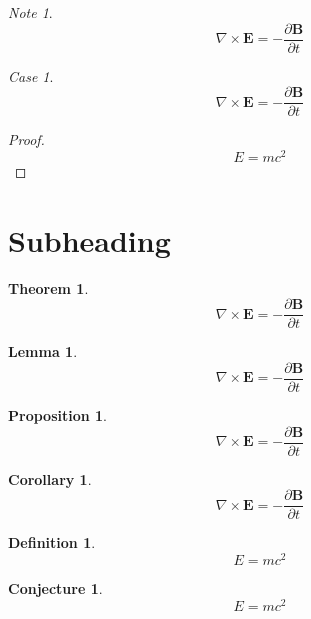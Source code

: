\documentclass[english,oneside, article]{memoir}
\theoremstyle{plain}
\newtheorem{Theorem}{Theorem}[chapter]
\newtheorem*{Lemma}{Lemma}
\newtheorem*{Proposition}{Proposition}
\newtheorem*{Corollary}{Corollary}
\theoremstyle{definition}
\newtheorem{Definition}{Definition}[chapter]
\newtheorem{Conjecture}{Conjecture}[chapter]
\theoremstyle{remark}
\newtheorem{Case}{Case}[chapter]
\newtheorem*{Note}{Note}
\begin{document}
\begin{Note}

\[\nabla \times \mathbf{E} = - \frac{\partial \mathbf{B}}{\partial t}\]

\end{Note}

\begin{Case}

\[\nabla \times \mathbf{E} = - \frac{\partial \mathbf{B}}{\partial t}\]

\end{Case}

\begin{proof}

\[E=mc^2\]

\end{proof}

\section{Subheading}\label{subheading}

\begin{Theorem}

\[\nabla \times \mathbf{E} = - \frac{\partial \mathbf{B}}{\partial t}\]

\end{Theorem}

\begin{Lemma}

\[\nabla \times \mathbf{E} = - \frac{\partial \mathbf{B}}{\partial t}\]

\end{Lemma}

\begin{Proposition}

\[\nabla \times \mathbf{E} = - \frac{\partial \mathbf{B}}{\partial t}\]

\end{Proposition}

\begin{Corollary}

\[\nabla \times \mathbf{E} = - \frac{\partial \mathbf{B}}{\partial t}\]

\end{Corollary}

\begin{Definition}

\[E=mc^2\]

\end{Definition}

\begin{Conjecture}

\[E=mc^2\]

\end{Conjecture}
\end{document}
